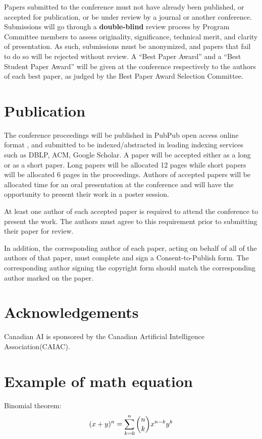 \documentclass[10pt]{cai}
\begin{document}
Papers submitted to the conference must not have already been published, or accepted for publication, or be under review by a journal or another conference. Submissions will go through a \textbf{double-blind} review process by Program Committee members to assess originality, significance, technical merit, and clarity of presentation. As such, submissions must be anonymized, and papers that fail to do so will be rejected without review. A “Best Paper Award” and a “Best Student Paper Award” will be given at the conference respectively to the authors of each best paper, as judged by the Best Paper Award Selection Committee.

\section{Publication}
\label{pub}

The conference proceedings will be published in PubPub open access online format \cite{pubpub2020}, and submitted to be indexed/abstracted in leading indexing services such as DBLP, ACM, Google Scholar. A paper will be accepted either as a long or as a short paper. Long papers will be allocated 12 pages while short papers will be allocated 6 pages in the proceedings. Authors of accepted papers will be allocated time for an oral presentation at the conference and will have the opportunity to present their work in a poster session. 

At least one author of each accepted paper is required to attend the conference to present the work. The authors must agree to this requirement prior to submitting their paper for review.

In addition, the corresponding author of each paper, acting on behalf of all of the authors of that paper, must complete and sign a Consent-to-Publish form. The corresponding author signing the copyright form should match the corresponding author marked on the paper.

\section*{Acknowledgements}
Canadian AI is sponsored by the Canadian Artificial Intelligence Association(CAIAC)\cite{caiac}.

\appendix

\section{Example of math equation }
Binomial theorem: \cite{abramowitz1948handbook}
\begin{equation}
(x+y)^n=\sum_{\substack{k=0}}^{n}\dbinom{n}{k}x^{n-k}y^k
\end{equation}





\printbibliography[heading=subbibintoc]
\end{document}
